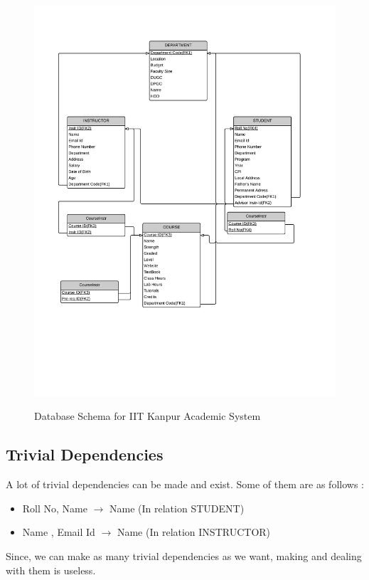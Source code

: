 \documentclass[12pt]{article}%
\begin{document}
\begin{figure}
\includegraphics[width=\textwidth]{ER2Schema.png}
\label{fig:er2schema}
\caption{Database Schema for IIT Kanpur Academic System}
\end{figure}

\subsection{Trivial Dependencies}
A lot of trivial dependencies can be made and exist. Some of them are as follows : 
\begin{itemize}
\item Roll No, Name $\rightarrow$ Name (In relation STUDENT)
\item Name , Email Id $\rightarrow$ Name (In relation INSTRUCTOR)
\end{itemize}

Since, we can make as many trivial dependencies as we want, making and dealing with them is useless. 
\end{document}
